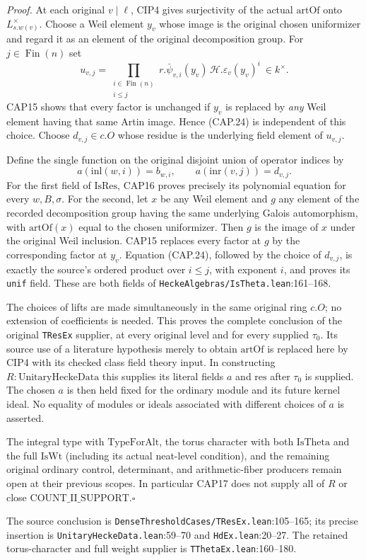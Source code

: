 \emph{Proof.}
At each original $v\mid\ell$, CIP4 gives surjectivity of the
actual $\mathrm{artOf}$ onto $L_{s.w(v)}^\times$.  Choose a Weil
element $y_v$ whose image is the original chosen uniformizer and
regard it as an element of the original decomposition group.
For $j\in\operatorname{Fin}(n)$ set
\[
 u_{v,j}=\prod_{\substack{i\in\operatorname{Fin}(n)\\i\leq j}}
       r.\bar\psi_{v,i}(y_v)\,
               \mathcal H.\varepsilon_v(y_v)^i\ \in k^\times.
 \tag{CAP.24}
\]
CAP15 shows that every factor is unchanged if $y_v$ is replaced by
\emph{any} Weil element having that same Artin image.  Hence (CAP.24)
is independent of this choice.  Choose $d_{v,j}\in c.O$ whose residue
is the underlying field element of $u_{v,j}$.

Define the single function on the original disjoint union of operator
indices by
\[
 a(\mathrm{inl}(w,i))=b_{w,i},\qquad
 a(\mathrm{inr}(v,j))=d_{v,j}.
 \tag{CAP.25}
\]
For the first field of $\mathrm{IsRes}$, CAP16 proves precisely its
polynomial equation for every $w,B,\sigma$.  For the second, let
$x$ be any Weil element and $g$ any element of the recorded
decomposition group having the same underlying Galois automorphism,
with $\mathrm{artOf}(x)$ equal to the chosen uniformizer.  Then $g$
is the image of $x$ under the original Weil inclusion.  CAP15 replaces
every factor at $g$ by the corresponding factor at $y_v$.  Equation
(CAP.24), followed by the choice of $d_{v,j}$, is exactly the
source's ordered product over $i\leq j$, with exponent $i$, and
proves its \texttt{unif} field.  These are both fields of
\nolinkurl{HeckeAlgebras/IsTheta.lean}:161--168.

The choices of lifts are made simultaneously in the same original
ring $c.O$; no extension of coefficients is needed.  This proves
the complete conclusion of the original \texttt{TResEx} supplier,
at every original level and for every supplied $\tau_0$.  Its source
use of a literature hypothesis merely to obtain $\mathrm{artOf}$
is replaced here by CIP4 with its checked class field theory input.
In constructing $R:\mathrm{UnitaryHeckeData}$ this supplies its
literal fields $a$ and $\mathrm{res}$ after $\tau_0$ is supplied.
The chosen $a$ is then held fixed for the ordinary module and its
future kernel ideal.  No equality of modules or ideals associated
with different choices of $a$ is asserted.

The integral type with $\mathrm{TypeForAlt}$, the torus character
with both $\mathrm{IsTheta}$ and the full $\mathrm{IsWt}$ (including
its actual neat-level condition), and the remaining original
ordinary control, determinant, and arithmetic-fiber producers remain open at their
previous scopes.  In particular CAP17 does not supply all of $R$
or close $\mathrm{COUNT\_II\_SUPPORT}$.\hfill$\square$

The source conclusion is \nolinkurl{DenseThresholdCases/TResEx.lean}:105--165;
its precise insertion is \nolinkurl{UnitaryHeckeData.lean}:59--70 and
\nolinkurl{HdEx.lean}:20--27.  The retained torus-character and full
weight supplier is \nolinkurl{TThetaEx.lean}:160--180.
